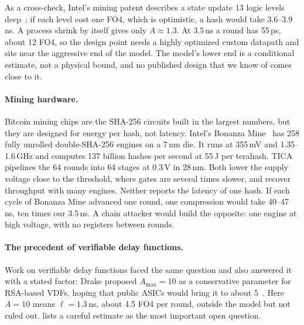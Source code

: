 As a cross-check, Intel's mining patent describes a state update 13 logic levels deep~\cite{SSM18}; if each level cost one FO4, which is optimistic, a hash would take 3.6--3.9\,ns. A process shrink by itself gives only $A \approx 1.3$. At 3.5\,ns a round has 55\,ps, about 12 FO4, so the design point needs a highly optimized custom datapath and sits near the aggressive end of the model. The model's lower end is a conditional estimate, not a physical bound, and no published design that we know of comes close to it.

\paragraph{Mining hardware.}
Bitcoin mining chips are the SHA-256 circuits built in the largest numbers, but they are designed for energy per hash, not latency. Intel's Bonanza Mine~\cite{SKR+22} has 258 fully unrolled double-SHA-256 engines on a 7\,nm die. It runs at 355\,mV and 1.35--1.6\,GHz and computes 137 billion hashes per second at 55\,J per terahash. TICA~\cite{LHZ+22} pipelines the 64 rounds into 64 stages at 0.3\,V in 28\,nm. Both lower the supply voltage close to the threshold, where gates are several times slower, and recover throughput with many engines. Neither reports the latency of one hash. If each cycle of Bonanza Mine advanced one round, one compression would take 40--47\,ns, ten times our 3.5\,ns. A chain attacker would build the opposite: one engine at high voltage, with no registers between rounds.

\paragraph{The precedent of verifiable delay functions.}
Work on verifiable delay functions faced the same question and also answered it with a stated factor: Drake proposed $A_{\max} = 10$ as a conservative parameter for RSA-based VDFs, hoping that public ASICs would bring it to about 5~\cite{Drake18}. Here $A = 10$ means $\ell = 1.3$\,ns, about 4.5 FO4 per round, outside the model but not ruled out.  lists a careful estimate as the most important open question.
